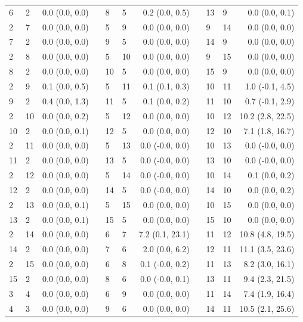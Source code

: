 \begin{xltabular}{\textwidth}{llrp{0.2cm}llrp{0.2cm}llr}
    6 & 2 & 0.0 (0.0, 0.0) & & 8 & 5 & 0.2 (0.0, 0.5) & & 13 & 9 & 0.0 (0.0, 0.1) \\
    2 & 7 & 0.0 (0.0, 0.0) & & 5 & 9 & 0.0 (0.0, 0.0) & & 9 & 14 & 0.0 (0.0, 0.0) \\
    7 & 2 & 0.0 (0.0, 0.0) & & 9 & 5 & 0.0 (0.0, 0.0) & & 14 & 9 & 0.0 (0.0, 0.0) \\
    2 & 8 & 0.0 (0.0, 0.0) & & 5 & 10 & 0.0 (0.0, 0.0) & & 9 & 15 & 0.0 (0.0, 0.0) \\
    8 & 2 & 0.0 (0.0, 0.0) & & 10 & 5 & 0.0 (0.0, 0.0) & & 15 & 9 & 0.0 (0.0, 0.0) \\
    2 & 9 & 0.1 (0.0, 0.5) & & 5 & 11 & 0.1 (0.1, 0.3) & & 10 & 11 & 1.0 (-0.1, 4.5) \\
    9 & 2 & 0.4 (0.0, 1.3) & & 11 & 5 & 0.1 (0.0, 0.2) & & 11 & 10 & 0.7 (-0.1, 2.9) \\
    2 & 10 & 0.0 (0.0, 0.2) & & 5 & 12 & 0.0 (0.0, 0.0) & & 10 & 12 & 10.2 (2.8, 22.5) \\
    10 & 2 & 0.0 (0.0, 0.1) & & 12 & 5 & 0.0 (0.0, 0.0) & & 12 & 10 & 7.1 (1.8, 16.7) \\
    2 & 11 & 0.0 (0.0, 0.0) & & 5 & 13 & 0.0 (-0.0, 0.0) & & 10 & 13 & 0.0 (-0.0, 0.0) \\
    11 & 2 & 0.0 (0.0, 0.0) & & 13 & 5 & 0.0 (-0.0, 0.0) & & 13 & 10 & 0.0 (-0.0, 0.0) \\
    2 & 12 & 0.0 (0.0, 0.0) & & 5 & 14 & 0.0 (-0.0, 0.0) & & 10 & 14 & 0.1 (0.0, 0.2) \\
    12 & 2 & 0.0 (0.0, 0.0) & & 14 & 5 & 0.0 (-0.0, 0.0) & & 14 & 10 & 0.0 (0.0, 0.2) \\
    2 & 13 & 0.0 (0.0, 0.1) & & 5 & 15 & 0.0 (0.0, 0.0) & & 10 & 15 & 0.0 (0.0, 0.0) \\
    13 & 2 & 0.0 (0.0, 0.1) & & 15 & 5 & 0.0 (0.0, 0.0) & & 15 & 10 & 0.0 (0.0, 0.0) \\
    2 & 14 & 0.0 (0.0, 0.0) & & 6 & 7 & 7.2 (0.1, 23.1) & & 11 & 12 & 10.8 (4.8, 19.5) \\
    14 & 2 & 0.0 (0.0, 0.0) & & 7 & 6 & 2.0 (0.0, 6.2) & & 12 & 11 & 11.1 (3.5, 23.6) \\
    2 & 15 & 0.0 (0.0, 0.0) & & 6 & 8 & 0.1 (-0.0, 0.2) & & 11 & 13 & 8.2 (3.0, 16.1) \\
    15 & 2 & 0.0 (0.0, 0.0) & & 8 & 6 & 0.0 (-0.0, 0.1) & & 13 & 11 & 9.4 (2.3, 21.5) \\
    3 & 4 & 0.0 (0.0, 0.0) & & 6 & 9 & 0.0 (0.0, 0.0) & & 11 & 14 & 7.4 (1.9, 16.4) \\
    4 & 3 & 0.0 (0.0, 0.0) & & 9 & 6 & 0.0 (0.0, 0.0) & & 14 & 11 & 10.5 (2.1, 25.6) \\

\end{xltabular}
